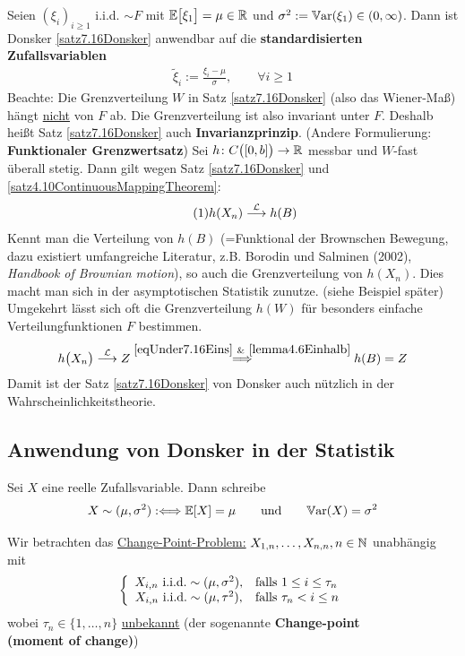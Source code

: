 Seien $(\xi_i)_{i\geq1}$ i.i.d. $\sim F$ mit $\mathbb{E}\big[\xi_1\big]=\mu\in\mathbb{R}$ und $\sigma^2:=\mathbb{V}\text{ar}(\xi_1)\in(0,\infty)$. 
Dann ist Donsker \ref{satz7.16Donsker} anwendbar auf die \textbf{standardisierten Zufallsvariablen}
\begin{align*}
	\tilde{\xi}_i:=\frac{\xi_i-\mu}{\sigma},\qquad\forall i\geq1
\end{align*}
Beachte: Die Grenzverteilung $W$ in Satz \ref{satz7.16Donsker} (also das Wiener-Maß) hängt \ul{nicht} von $F$ ab. 
Die Grenzverteilung ist also invariant unter $F$. Deshalb heißt Satz \ref{satz7.16Donsker} auch \textbf{Invarianzprinzip}. 
(Andere Formulierung: \textbf{Funktionaler Grenzwertsatz})\nl
Sei $h\colon C\big([0,b]\big)\to\mathbb{R}$ messbar und $W$-fast überall stetig. 
Dann gilt wegen Satz \ref{satz7.16Donsker} und \ref{satz4.10ContinuousMappingTheorem}:
\begin{align}\label{eqUnder7.16Eins}\tag{1}
	h(X_n)\stackrel{\mathcal{L}}{\longrightarrow} h(B)
\end{align}
Kennt man die Verteilung von $h(B)$ (=Funktional der Brownschen Bewegung, dazu existiert umfangreiche Literatur, z.B. Borodin und Salminen (2002),
\textit{Handbook of Brownian motion}), so auch die Grenzverteilung von $h(X_n)$. Dies macht man sich in der asymptotischen Statistik zunutze.
(siehe Beispiel später) Umgekehrt lässt sich oft die Grenzverteilung $h(W)$ für besonders einfache Verteilungfunktionen $F$ bestimmen.
\begin{align*}
	h\big(X_n\big)\stackrel{\mathcal{L}}{\longrightarrow}Z
	\overset{\eqref{eqUnder7.16Eins}~\&~\ref{lemma4.6Einhalb}}{\implies}
	h(B)=Z
\end{align*}
Damit ist der Satz \ref{satz7.16Donsker} von Donsker auch nützlich in der Wahrscheinlichkeitstheorie.

\subsection{Anwendung von Donsker in der Statistik}
\begin{notation}
	Sei $X$ eine reelle Zufallsvariable. Dann schreibe
	\begin{align*}
		X\sim(\mu,\sigma^2):\Longleftrightarrow\mathbb{E}[X]=\mu\qquad\text{und}\qquad\mathbb{V}\text{ar}(X)=\sigma^2
	\end{align*}
\end{notation}

Wir betrachten das \underline{Change-Point-Problem:}
$X_{1,n},\ldots,X_{n,n},n\in\mathbb{N}$ unabhängig mit 
\begin{align*}
	\left\lbrace\begin{array}{cl}
		X_{i,n}\text{ i.i.d.}\sim(\mu,\sigma^2), &\text{falls } 1\leq i\leq\tau_n\\
		X_{i,n}\text{ i.i.d.}\sim(\mu,\tau^2), &\text{falls } \tau_n< i\leq n
	\end{array}\right.
\end{align*}
wobei $\tau_n\in\lbrace1,\ldots,n\rbrace$ \ul{unbekannt} (der sogenannte \textbf{Change-point\\ (moment of change)}) 

